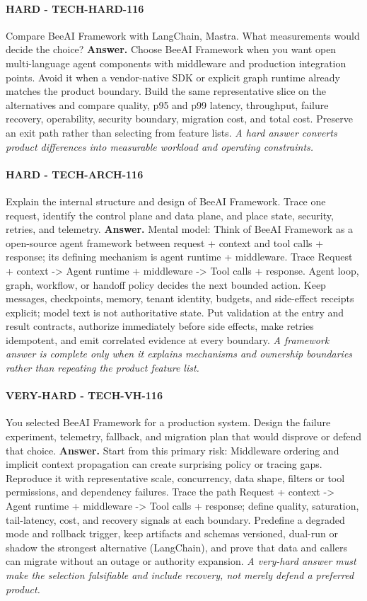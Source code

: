 \paragraph{HARD - TECH-HARD-116} Compare BeeAI Framework with LangChain, Mastra. What measurements would decide the choice?
\textbf{Answer.} Choose BeeAI Framework when you want open multi-language agent components with middleware and production integration points. Avoid it when a vendor-native SDK or explicit graph runtime already matches the product boundary. Build the same representative slice on the alternatives and compare quality, p95 and p99 latency, throughput, failure recovery, operability, security boundary, migration cost, and total cost. Preserve an exit path rather than selecting from feature lists.
\textit{A hard answer converts product differences into measurable workload and operating constraints.}
\paragraph{HARD - TECH-ARCH-116} Explain the internal structure and design of BeeAI Framework. Trace one request, identify the control plane and data plane, and place state, security, retries, and telemetry.
\textbf{Answer.} Mental model: Think of BeeAI Framework as a open-source agent framework between request + context and tool calls + response; its defining mechanism is agent runtime + middleware. Trace Request + context -> Agent runtime + middleware -> Tool calls + response. Agent loop, graph, workflow, or handoff policy decides the next bounded action. Keep messages, checkpoints, memory, tenant identity, budgets, and side-effect receipts explicit; model text is not authoritative state. Put validation at the entry and result contracts, authorize immediately before side effects, make retries idempotent, and emit correlated evidence at every boundary.
\textit{A framework answer is complete only when it explains mechanisms and ownership boundaries rather than repeating the product feature list.}
\paragraph{VERY-HARD - TECH-VH-116} You selected BeeAI Framework for a production system. Design the failure experiment, telemetry, fallback, and migration plan that would disprove or defend that choice.
\textbf{Answer.} Start from this primary risk: Middleware ordering and implicit context propagation can create surprising policy or tracing gaps. Reproduce it with representative scale, concurrency, data shape, filters or tool permissions, and dependency failures. Trace the path Request + context -> Agent runtime + middleware -> Tool calls + response; define quality, saturation, tail-latency, cost, and recovery signals at each boundary. Predefine a degraded mode and rollback trigger, keep artifacts and schemas versioned, dual-run or shadow the strongest alternative (LangChain), and prove that data and callers can migrate without an outage or authority expansion.
\textit{A very-hard answer must make the selection falsifiable and include recovery, not merely defend a preferred product.}
